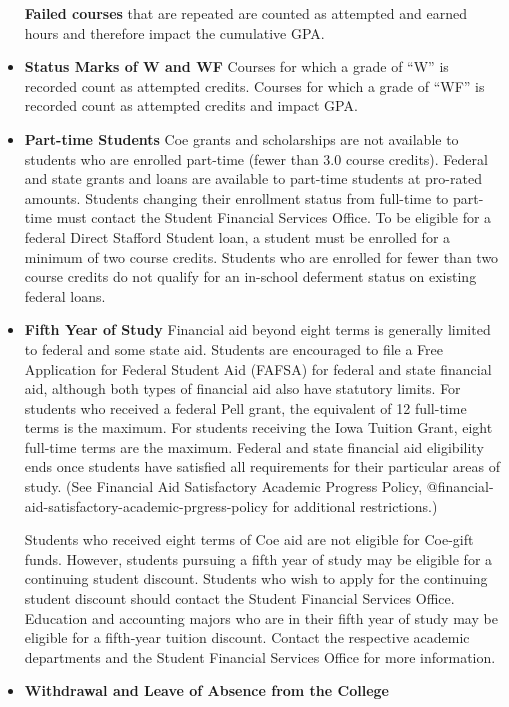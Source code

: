 \documentclass[
  letterpaper,
]{scrbook}
\begin{document}
\begin{itemize}
  \textbf{Failed courses} that are repeated are counted as attempted and
  earned hours and therefore impact the cumulative GPA.
\item
  \textbf{Status Marks of W and WF} Courses for which a grade of ``W''
  is recorded count as attempted credits. Courses for which a grade of
  ``WF'' is recorded count as attempted credits and impact GPA.
\item
  \textbf{Part-time Students} Coe grants and scholarships are not
  available to students who are enrolled part-time (fewer than 3.0
  course credits). Federal and state grants and loans are available to
  part-time students at pro-rated amounts. Students changing their
  enrollment status from full-time to part-time must contact the Student
  Financial Services Office. To be eligible for a federal Direct
  Stafford Student loan, a student must be enrolled for a minimum of two
  course credits. Students who are enrolled for fewer than two course
  credits do not qualify for an in-school deferment status on existing
  federal loans.
\item
  \textbf{Fifth Year of Study} Financial aid beyond eight terms is
  generally limited to federal and some state aid. Students are
  encouraged to file a Free Application for Federal Student Aid (FAFSA)
  for federal and state financial aid, although both types of financial
  aid also have statutory limits. For students who received a federal
  Pell grant, the equivalent of 12 full-time terms is the maximum. For
  students receiving the Iowa Tuition Grant, eight full-time terms are
  the maximum. Federal and state financial aid eligibility ends once
  students have satisfied all requirements for their particular areas of
  study. (See Financial Aid Satisfactory Academic Progress Policy,
  @financial-aid-satisfactory-academic-prgress-policy for additional
  restrictions.)

  Students who received eight terms of Coe aid are not eligible for
  Coe-gift funds. However, students pursuing a fifth year of study may
  be eligible for a continuing student discount. Students who wish to
  apply for the continuing student discount should contact the Student
  Financial Services Office. Education and accounting majors who are in
  their fifth year of study may be eligible for a fifth-year tuition
  discount. Contact the respective academic departments and the Student
  Financial Services Office for more information.
\item
  \textbf{Withdrawal and Leave of Absence from the College}
\end{itemize}
\end{document}
